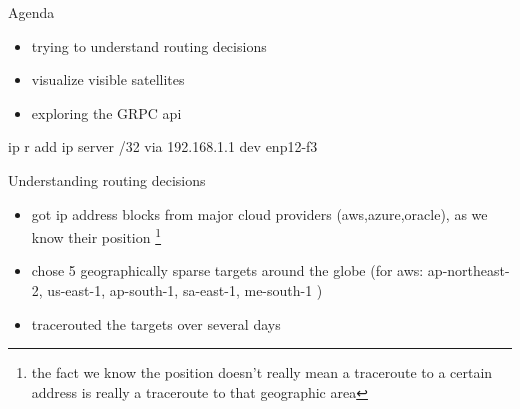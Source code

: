 \documentclass[NET,english,beameralt]{tumbeamer}
\begin{document}
\begin{frame}{Agenda}
    \begin{itemize}
        \item trying to understand routing decisions
        \item visualize visible satellites
        \item exploring the GRPC api
    \end{itemize}
\end{frame}
ip r add ip server /32 via 192.168.1.1 dev enp12-f3
\begin{frame}{Understanding routing decisions}
    \begin{itemize}
        \item got ip address blocks from major cloud providers (aws,azure,oracle), as we know their position \footnote[]{the fact we know the position doesn't really mean a traceroute to a certain address is really a traceroute to that geographic area}
        \item chose 5 geographically sparse targets around the globe (for aws: ap-northeast-2, us-east-1, ap-south-1, sa-east-1, me-south-1 )
        \item tracerouted the targets over several days 
    \end{itemize}
\end{frame}
\end{document}
